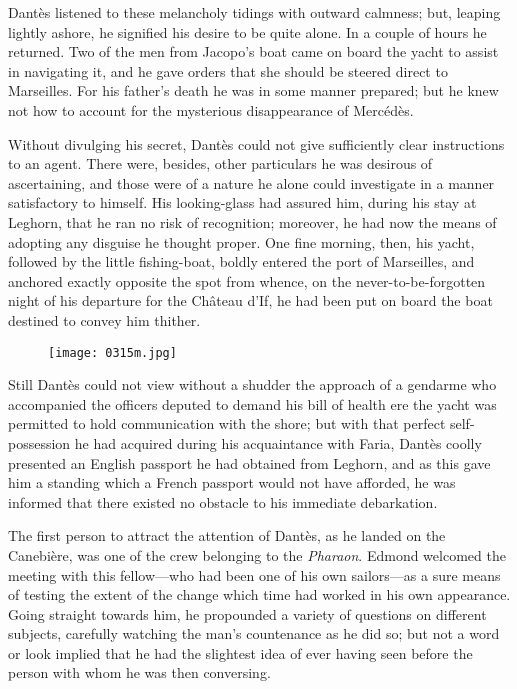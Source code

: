 Dantès listened to these melancholy tidings with outward calmness; but,
leaping lightly ashore, he signified his desire to be quite alone. In a
couple of hours he returned. Two of the men from Jacopo’s boat came on
board the yacht to assist in navigating it, and he gave orders that she
should be steered direct to Marseilles. For his father’s death he was
in some manner prepared; but he knew not how to account for the
mysterious disappearance of Mercédès.

Without divulging his secret, Dantès could not give sufficiently clear
instructions to an agent. There were, besides, other particulars he was
desirous of ascertaining, and those were of a nature he alone could
investigate in a manner satisfactory to himself. His looking-glass had
assured him, during his stay at Leghorn, that he ran no risk of
recognition; moreover, he had now the means of adopting any disguise he
thought proper. One fine morning, then, his yacht, followed by the
little fishing-boat, boldly entered the port of Marseilles, and
anchored exactly opposite the spot from whence, on the
never-to-be-forgotten night of his departure for the Château d’If, he
had been put on board the boat destined to convey him thither.

\begin{figure}[ht]
\texttt{[image: 0315m.jpg]}
\end{figure}

Still Dantès could not view without a shudder the approach of a
gendarme who accompanied the officers deputed to demand his bill of
health ere the yacht was permitted to hold communication with the
shore; but with that perfect self-possession he had acquired during his
acquaintance with Faria, Dantès coolly presented an English passport he
had obtained from Leghorn, and as this gave him a standing which a
French passport would not have afforded, he was informed that there
existed no obstacle to his immediate debarkation.

The first person to attract the attention of Dantès, as he landed on
the Canebière, was one of the crew belonging to the \textit{Pharaon}. Edmond
welcomed the meeting with this fellow—who had been one of his own
sailors—as a sure means of testing the extent of the change which time
had worked in his own appearance. Going straight towards him, he
propounded a variety of questions on different subjects, carefully
watching the man’s countenance as he did so; but not a word or look
implied that he had the slightest idea of ever having seen before the
person with whom he was then conversing.


